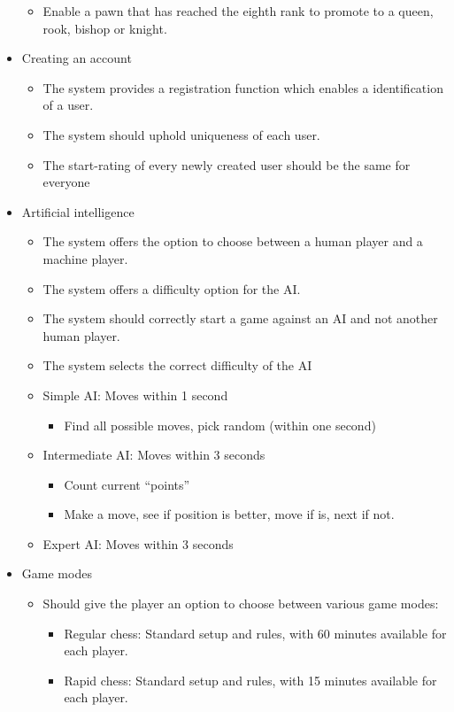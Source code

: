 \documentclass{article}
\begin{document}
\begin{itemize}
\begin{itemize}
		\item Enable a pawn that has reached the eighth rank to promote to a queen, rook, bishop or knight. 
	\end{itemize}
	\item Creating an account
	\begin{itemize}
		\item The system provides a registration function which enables a identification of a user.
		\item The system should uphold uniqueness of each user.
		\item The start-rating of every newly created user should be the same for everyone 
	\end{itemize}
	\item Artificial intelligence
	\begin{itemize}
	    \item The system offers the option to choose between a human player and a machine player.
		\item The system offers a difficulty option for the AI.
		\item The system should correctly start a game against an AI and not another human player.
		\item The system selects the correct difficulty of the AI
		\item Simple AI: Moves within 1 second
		\begin{itemize}
			\item Find all possible moves, pick random (within one second)
		\end{itemize}
		\item Intermediate AI: Moves within 3 seconds
		\begin{itemize}
			\item Count current “points”
			\item Make a move, see if position is better, move if is, next if not.
		\end{itemize}
		\item Expert AI: Moves within 3 seconds
	\end{itemize}
	\item Game modes
	\begin{itemize}
		\item Should give the player an option to choose between various game modes:
		\begin{itemize}
			\item Regular chess: Standard setup and rules, with 60 minutes available for each player.
			\item Rapid chess: Standard setup and rules, with 15 minutes available for each player.

\end{itemize}
\end{itemize}
\end{itemize}
\end{document}

